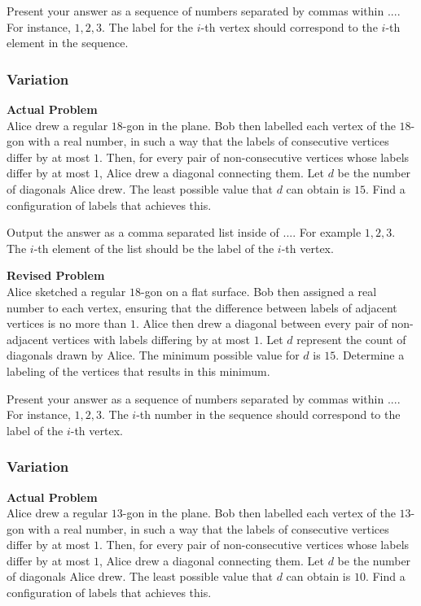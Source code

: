Present your answer as a sequence of numbers separated by commas within $\boxed{...}$. For instance, $\boxed{1, 2, 3}$. The label for the $i$-th vertex should correspond to the $i$-th element in the sequence.

\subsubsection{Variation}
\textbf{Actual Problem}\\
Alice drew a regular $18$-gon in the plane. Bob then labelled each vertex of the $18$-gon with a real number, in such a way that the labels of consecutive vertices differ by at most $1$. Then, for every pair of non-consecutive vertices whose labels differ by at most $1$, Alice drew a diagonal connecting them. Let $d$ be the number of diagonals Alice drew. The least possible value that $d$ can obtain is $15$. Find a configuration of labels that achieves this.

Output the answer as a comma separated list inside of $\boxed{...}$. For example $\boxed{1, 2, 3}$.
The $i$-th element of the list should be the label of the $i$-th vertex.

\textbf{Revised Problem}\\
Alice sketched a regular $18$-gon on a flat surface. Bob then assigned a real number to each vertex, ensuring that the difference between labels of adjacent vertices is no more than $1$. Alice then drew a diagonal between every pair of non-adjacent vertices with labels differing by at most $1$. Let $d$ represent the count of diagonals drawn by Alice. The minimum possible value for $d$ is $15$. Determine a labeling of the vertices that results in this minimum.

Present your answer as a sequence of numbers separated by commas within $\boxed{...}$. For instance, $\boxed{1, 2, 3}$. The $i$-th number in the sequence should correspond to the label of the $i$-th vertex.

\subsubsection{Variation}
\textbf{Actual Problem}\\
Alice drew a regular $13$-gon in the plane. Bob then labelled each vertex of the $13$-gon with a real number, in such a way that the labels of consecutive vertices differ by at most $1$. Then, for every pair of non-consecutive vertices whose labels differ by at most $1$, Alice drew a diagonal connecting them. Let $d$ be the number of diagonals Alice drew. The least possible value that $d$ can obtain is $10$. Find a configuration of labels that achieves this.

